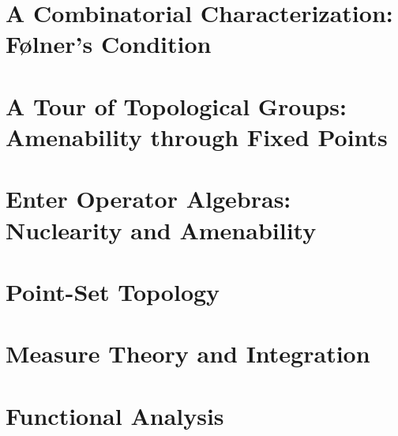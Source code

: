 \documentclass[10pt]{package2}
\newcommand{\1}{\mathds{1}}
\begin{document}
\chapter{A Combinatorial Characterization: Følner's Condition}

\chapter{A Tour of Topological Groups: Amenability through Fixed Points}
\chapter{Enter Operator Algebras: Nuclearity and Amenability}
\appendix
\chapter{Point-Set Topology}

\chapter{Measure Theory and Integration}

\chapter{Functional Analysis}

\nocite{*}
\printbibliography
\end{document}
